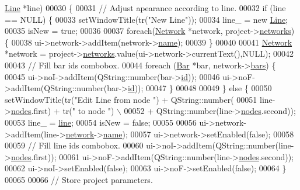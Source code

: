\begin{DoxyCode}
      \hyperlink{class_line}{Line} *line)
00030 \{
00031   \textcolor{comment}{// Adjust apearance according to line.}
00032   \textcolor{keywordflow}{if} (line == NULL) \{
00033     setWindowTitle(tr(\textcolor{stringliteral}{"New Line"}));
00034     line\_ = \textcolor{keyword}{new} \hyperlink{class_line}{Line};
00035     isNew = \textcolor{keyword}{true};
00036 
00037     \textcolor{keywordflow}{foreach}(\hyperlink{class_network}{Network} *network, project->\hyperlink{class_project_aa98126154cab59769a431668e6f17daf}{networks}) \{
00038       ui->network->addItem(network->\hyperlink{class_network_ab6643733a517f930c60b06f5ffd78186}{name});
00039     \}
00040 
00041     \hyperlink{class_network}{Network} *network = project->\hyperlink{class_project_aa98126154cab59769a431668e6f17daf}{networks}.value(ui->network->currentText(),NULL);
00042 
00043     \textcolor{comment}{// Fill bar ids combobox.}
00044     \textcolor{keywordflow}{foreach} (\hyperlink{class_bar}{Bar} *bar, network->\hyperlink{class_network_a7fe628f7de34a96235cbd3f2cee4aff2}{bars}) \{
00045       ui->noI->addItem(QString::number(bar->\hyperlink{class_bar_a9dc5c6a6d44fe412ae34ef8a881b8dce}{id}));
00046       ui->noF->addItem(QString::number(bar->\hyperlink{class_bar_a9dc5c6a6d44fe412ae34ef8a881b8dce}{id}));
00047     \}
00048 
00049   \} \textcolor{keywordflow}{else} \{
00050     setWindowTitle(tr(\textcolor{stringliteral}{"Edit Line from node "}) + QString::number(
00051                      line->\hyperlink{class_line_afd17c40d656e6a8d677cb22df5f0c70b}{nodes}.first) + tr(\textcolor{stringliteral}{" to node "}) \(\backslash\)
00052                    + QString::number(line->\hyperlink{class_line_afd17c40d656e6a8d677cb22df5f0c70b}{nodes}.second));
00053     line\_ = \hyperlink{class_line_properties_ae99691d680b4df7bac3419b5588bd777}{line};
00054     isNew = \textcolor{keyword}{false};
00055 
00056     ui->network->addItem(line->\hyperlink{class_line_aefdf6a6c3e3775b5a16b344c1d33964e}{network}->\hyperlink{class_network_ab6643733a517f930c60b06f5ffd78186}{name});
00057     ui->network->setEnabled(\textcolor{keyword}{false});
00058 
00059     \textcolor{comment}{// Fill line ids combobox.}
00060     ui->noI->addItem(QString::number(line->\hyperlink{class_line_afd17c40d656e6a8d677cb22df5f0c70b}{nodes}.first));
00061     ui->noF->addItem(QString::number(line->\hyperlink{class_line_afd17c40d656e6a8d677cb22df5f0c70b}{nodes}.second));
00062     ui->noI->setEnabled(\textcolor{keyword}{false});
00063     ui->noF->setEnabled(\textcolor{keyword}{false});
00064   \}
00065 
00066   \textcolor{comment}{// Store project parameters.}

\end{DoxyCode}

